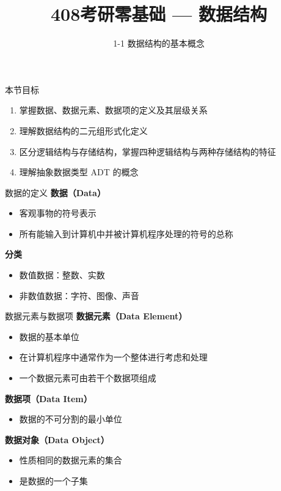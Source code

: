 \documentclass[10pt, aspectratio=169]{beamer}
\title{408考研零基础 --- 数据结构}
\subtitle{1-1 数据结构的基本概念}
\author{}
\date{}
\begin{document}
\begin{frame}{本节目标}
    \begin{enumerate}
        \item 掌握数据、数据元素、数据项的定义及其层级关系
        \item 理解数据结构的二元组形式化定义
        \item 区分逻辑结构与存储结构，掌握四种逻辑结构与两种存储结构的特征
        \item 理解抽象数据类型 ADT 的概念
    \end{enumerate}
\end{frame}

\begin{frame}{数据的定义}
    \textbf{数据（Data）}
    \begin{itemize}
        \item 客观事物的符号表示
        \item 所有能输入到计算机中并被计算机程序处理的符号的总称
    \end{itemize}
    \vspace{0.5em}
    \textbf{分类}
    \begin{itemize}
        \item 数值数据：整数、实数
        \item 非数值数据：字符、图像、声音
    \end{itemize}
\end{frame}

\begin{frame}{数据元素与数据项}
    \textbf{数据元素（Data Element）}
    \begin{itemize}
        \item 数据的基本单位
        \item 在计算机程序中通常作为一个整体进行考虑和处理
        \item 一个数据元素可由若干个数据项组成
    \end{itemize}
    \vspace{0.5em}
    \textbf{数据项（Data Item）}
    \begin{itemize}
        \item 数据的不可分割的最小单位
    \end{itemize}
    \vspace{0.5em}
    \textbf{数据对象（Data Object）}
    \begin{itemize}
        \item 性质相同的数据元素的集合
        \item 是数据的一个子集
    \end{itemize}
\end{frame}
\end{document}
